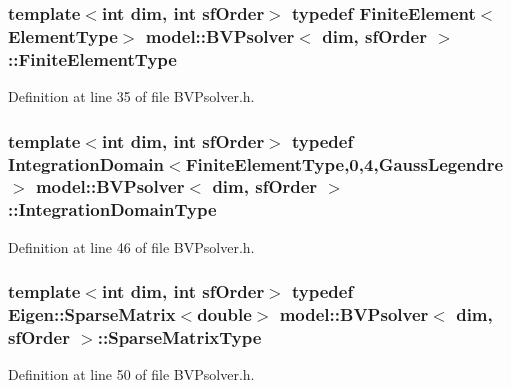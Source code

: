 \subsubsection[{Finite\+Element\+Type}]{\setlength{\rightskip}{0pt plus 5cm}template$<$int dim, int sf\+Order$>$ typedef {\bf Finite\+Element}$<${\bf Element\+Type}$>$ {\bf model\+::\+B\+V\+Psolver}$<$ {\bf dim}, sf\+Order $>$\+::{\bf Finite\+Element\+Type}}\label{classmodel_1_1_b_v_psolver_a010425e48ff247a2d8203f4625b29ea1}


Definition at line 35 of file B\+V\+Psolver.\+h.

\hypertarget{classmodel_1_1_b_v_psolver_af03861ac7fe7224f64e5b900e784326c}{}
\subsubsection[{Integration\+Domain\+Type}]{\setlength{\rightskip}{0pt plus 5cm}template$<$int dim, int sf\+Order$>$ typedef {\bf Integration\+Domain}$<${\bf Finite\+Element\+Type},0,4,{\bf Gauss\+Legendre}$>$ {\bf model\+::\+B\+V\+Psolver}$<$ {\bf dim}, sf\+Order $>$\+::{\bf Integration\+Domain\+Type}}\label{classmodel_1_1_b_v_psolver_af03861ac7fe7224f64e5b900e784326c}


Definition at line 46 of file B\+V\+Psolver.\+h.

\hypertarget{classmodel_1_1_b_v_psolver_aa1a436138f81997a837ad1996ecf5eaf}{}
\subsubsection[{Sparse\+Matrix\+Type}]{\setlength{\rightskip}{0pt plus 5cm}template$<$int dim, int sf\+Order$>$ typedef Eigen\+::\+Sparse\+Matrix$<$double$>$ {\bf model\+::\+B\+V\+Psolver}$<$ {\bf dim}, sf\+Order $>$\+::{\bf Sparse\+Matrix\+Type}}\label{classmodel_1_1_b_v_psolver_aa1a436138f81997a837ad1996ecf5eaf}


Definition at line 50 of file B\+V\+Psolver.\+h.

\hypertarget{classmodel_1_1_b_v_psolver_aa514066cc07fb36e5f66dcc384b81309}{}
